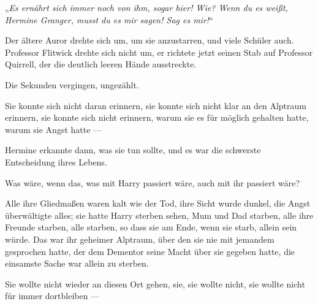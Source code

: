 „\emph{Es ernährt sich immer noch von ihm, sogar hier! Wie? Wenn du es weißt, Hermine Granger, musst du es mir sagen! Sag es mir!}“

Der ältere Auror drehte sich um, um sie anzustarren, und viele Schüler auch. Professor Flitwick drehte sich nicht um, er richtete jetzt seinen Stab auf Professor Quirrell, der die deutlich leeren Hände ausstreckte.

Die Sekunden vergingen, ungezählt.

Sie konnte sich nicht daran erinnern, sie konnte sich nicht klar an den Alptraum erinnern, sie konnte sich nicht erinnern, warum sie es für möglich gehalten hatte, warum sie Angst hatte —

Hermine erkannte dann, was sie tun sollte, und es war die schwerste Entscheidung ihres Lebens.

Was wäre, wenn das, was mit Harry passiert wäre, auch mit ihr passiert wäre?

Alle ihre Gliedmaßen waren kalt wie der Tod, ihre Sicht wurde dunkel, die Angst überwältigte alles; sie hatte Harry sterben sehen, Mum und Dad starben, alle ihre Freunde starben, alle starben, so dass sie am Ende, wenn sie starb, allein sein würde. Das war ihr geheimer Alptraum, über den sie nie mit jemandem gesprochen hatte, der dem Dementor seine Macht über sie gegeben hatte, die einsamste Sache war allein zu sterben.

Sie wollte nicht wieder an diesen Ort gehen, sie, sie wollte nicht, sie wollte nicht für immer dortbleiben —

